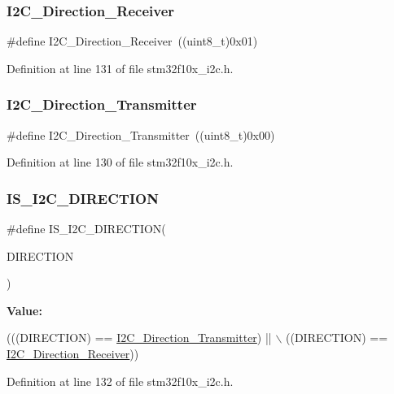 \subsubsection{\texorpdfstring{I2\+C\+\_\+\+Direction\+\_\+\+Receiver}{I2C\_Direction\_Receiver}}
{\footnotesize\ttfamily \#define I2\+C\+\_\+\+Direction\+\_\+\+Receiver~((uint8\+\_\+t)0x01)}



Definition at line 131 of file stm32f10x\+\_\+i2c.\+h.

\mbox{\label{group___i2_c__transfer__direction_ga9895ee2d7d8cc8ba4daafafa1c3ce1ac}} 
\subsubsection{\texorpdfstring{I2\+C\+\_\+\+Direction\+\_\+\+Transmitter}{I2C\_Direction\_Transmitter}}
{\footnotesize\ttfamily \#define I2\+C\+\_\+\+Direction\+\_\+\+Transmitter~((uint8\+\_\+t)0x00)}



Definition at line 130 of file stm32f10x\+\_\+i2c.\+h.

\mbox{\label{group___i2_c__transfer__direction_ga33368efe652bc25b4f4b74f02ce0657e}} 
\subsubsection{\texorpdfstring{I\+S\+\_\+\+I2\+C\+\_\+\+D\+I\+R\+E\+C\+T\+I\+ON}{IS\_I2C\_DIRECTION}}
{\footnotesize\ttfamily \#define I\+S\+\_\+\+I2\+C\+\_\+\+D\+I\+R\+E\+C\+T\+I\+ON(\begin{DoxyParamCaption}\item[{}]{D\+I\+R\+E\+C\+T\+I\+ON }\end{DoxyParamCaption})}

{\bfseries Value\+:}
\begin{DoxyCode}
(((DIRECTION) == \hyperlink{group___i2_c__transfer__direction_ga9895ee2d7d8cc8ba4daafafa1c3ce1ac}{I2C\_Direction\_Transmitter}) || \(\backslash\)
                                     ((DIRECTION) == \hyperlink{group___i2_c__transfer__direction_gafe3b9b98552980ca56c8e21a90040fa0}{I2C\_Direction\_Receiver}))
\end{DoxyCode}


Definition at line 132 of file stm32f10x\+\_\+i2c.\+h.

